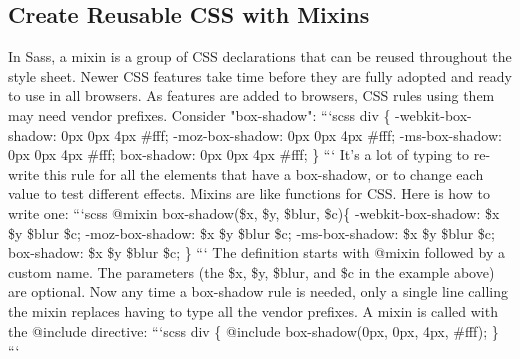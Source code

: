 \documentclass{article}%
\begin{document}
\subsection{Create Reusable CSS with Mixins}%
\label{subsec:CreateReusableCSSwithMixins}%
In Sass, a mixin is a group of CSS declarations that can be reused throughout the style sheet.\newline%
Newer CSS features take time before they are fully adopted and ready to use in all browsers. As features are added to browsers, CSS rules using them may need vendor prefixes. Consider "box{-}shadow":\newline%
```scss\newline%
div \{\newline%
  {-}webkit{-}box{-}shadow: 0px 0px 4px \#fff;\newline%
  {-}moz{-}box{-}shadow: 0px 0px 4px \#fff;\newline%
  {-}ms{-}box{-}shadow: 0px 0px 4px \#fff;\newline%
  box{-}shadow: 0px 0px 4px \#fff;\newline%
\}\newline%
```\newline%
It's a lot of typing to re{-}write this rule for all the elements that have a box{-}shadow, or to change each value to test different effects.\newline%
Mixins are like functions for CSS. Here is how to write one:\newline%
```scss\newline%
@mixin box{-}shadow(\$x, \$y, \$blur, \$c)\{ \newline%
  {-}webkit{-}box{-}shadow: \$x \$y \$blur \$c;\newline%
  {-}moz{-}box{-}shadow: \$x \$y \$blur \$c;\newline%
  {-}ms{-}box{-}shadow: \$x \$y \$blur \$c;\newline%
  box{-}shadow: \$x \$y \$blur \$c;\newline%
\}\newline%
```\newline%
The definition starts with @mixin followed by a custom name. The parameters (the \$x, \$y, \$blur, and \$c in the example above) are optional.\newline%
Now any time a box{-}shadow rule is needed, only a single line calling the mixin replaces having to type all the vendor prefixes. A mixin is called with the @include directive:\newline%
```scss\newline%
div \{\newline%
  @include box{-}shadow(0px, 0px, 4px, \#fff);\newline%
\}\newline%
```\newline%
\end{document}
